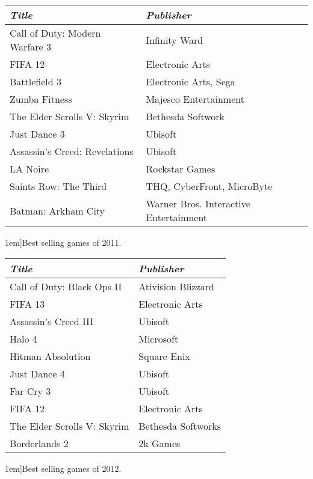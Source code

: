 \begin{table*}[ht]
	\footnotesize
	\renewcommand{\arraystretch}{1.5}
	\begin{tabular}{p{19em} p{15em}}
		\toprule
		\emph{Title} & \emph{Publisher}\\
		\midrule
	Call of Duty: Modern Warfare 3 & Infinity Ward
	\\
	FIFA 12 & Electronic Arts
	\\
	Battlefield 3 & Electronic Arts, Sega
	\\
	Zumba Fitness & Majesco Entertainment
	\\
	The Elder Scrolls V: Skyrim & Bethesda Softwork
	\\
	Just Dance 3 & Ubisoft
	\\
	Assassin's Creed: Revelations & Ubisoft
	\\
	LA Noire & Rockstar Games
	\\
	Saints Row: The Third & THQ, CyberFront, MicroByte
	\\
	Batman: Arkham City & Warner Bros. Interactive Entertainment 
	\\
	\bottomrule
	\end{tabular}
	\vspace{1.5em}
	\caption[][1em]{Best selling games of 2011.}
	\label{tab:bestSellingGames2011}
\end{table*}

\begin{table*}[ht]
	\footnotesize
	\renewcommand{\arraystretch}{1.5}
	\begin{tabular}{p{19em} p{15em}}
		\toprule
		\emph{Title} & \emph{Publisher}\\
		\midrule
	Call of Duty: Black Ops II & Ativision Blizzard
	\\
	FIFA 13 & Electronic Arts
	\\
	Assassin's Creed III & Ubisoft
	\\
    Halo 4 & Microsoft	
    \\
	Hitman Absolution & Square Enix
	\\
	Just Dance 4 & Ubisoft
	\\
	Far Cry 3 & Ubisoft
	\\
	FIFA 12 & Electronic Arts
	\\
	The Elder Scrolls V: Skyrim & Bethesda Softworks
	\\
	Borderlands 2 & 2k Games
	\\
	
	\bottomrule
	\end{tabular}
	\vspace{1.5em}
	\caption[][1em]{Best selling games of 2012.}
	\label{tab:bestSellingGames2012}
\end{table*}

